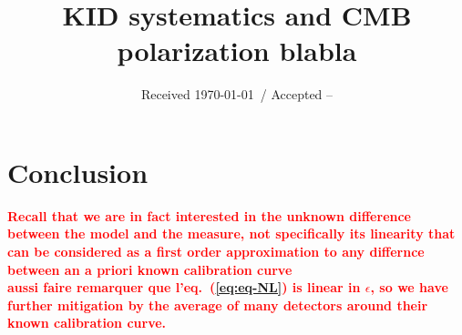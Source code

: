 \documentclass[twocolumn, traditabstract]{aa}
\newcommand{\todo}[1]{\textcolor{red}{\textbf{#1}}}
\begin{document}
\title{KID systematics and CMB polarization blabla}

\date{Received \today \ / Accepted --}
	
\tableofcontents
\maketitle








\newpage
\section{Conclusion}
\label{conclusion}

\todo{Recall that we are in fact interested in the unknown difference between
  the model and the measure, not specifically its linearity that can be
  considered as a first order approximation to any differnce between an a priori
  known calibration curve}\\

\todo{aussi faire remarquer que l'eq.~(\ref{eq:eq-NL}) is linear in $\epsilon$,
  so we have further mitigation by the average of many detectors around their
  known calibration curve.}\\
\end{document}
